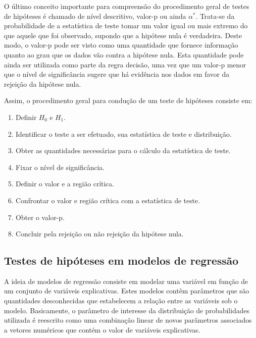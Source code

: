 O último conceito importante para compreensão do procedimento geral de  testes de hipóteses é chamado de nível descritivo, valor-p ou ainda $\alpha^*$. Trata-se da probabilidade de a estatística de teste tomar um valor igual ou mais extremo do que aquele que foi observado, supondo que a hipótese nula é verdadeira. Deste modo, o valor-p pode ser visto como uma quantidade que fornece informação quanto ao grau que os dados vão contra a hipótese nula. Esta quantidade pode ainda ser utilizada como parte da regra decisão, uma vez que um valor-p menor que o nível de significância sugere que há evidência nos dados em favor da rejeição da hipótese nula.

Assim, o procedimento geral para condução de um teste de hipóteses 
consiste em: 

\begin{enumerate}
  
  \item Definir $H_0$ e $H_1$.
  
  \item Identificar o teste a ser efetuado, sua estatística de teste e 
distribuição.
  
  \item Obter as quantidades necessárias para o cálculo da estatística de teste.
  
  \item Fixar o nível de significância.
  
  \item Definir o valor e a região crítica.
  
  \item Confrontar o valor e região crítica com a estatística de teste.
  
  \item Obter o valor-p.
  
  \item Concluir pela rejeição ou não rejeição da hipótese nula.
  
\end{enumerate}

\subsection{Testes de hipóteses em modelos de regressão}

A ideia de modelos de regressão consiste em modelar uma variável em função de um conjunto de variáveis explicativas. Estes modelos contêm parâmetros que são quantidades desconhecidas que estabelecem a relação entre as variáveis sob o modelo. Basicamente, o parâmetro de interesse da distribuição de probabilidades utilizada é reescrito como uma combinação linear de novos parâmetros associados a vetores numéricos que contém o valor de variáveis explicativas.

